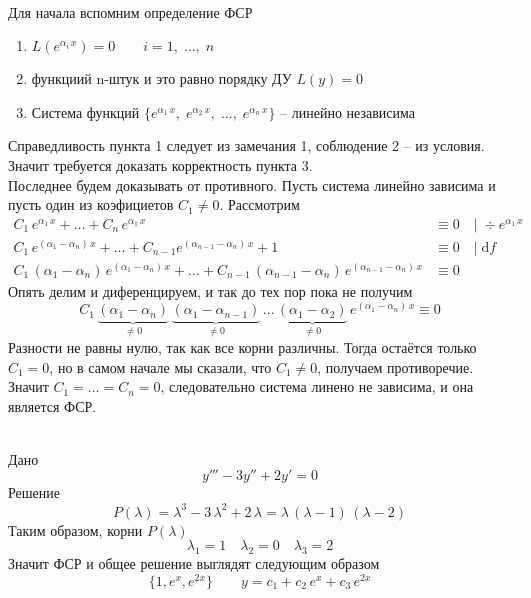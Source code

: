 \begin{Proof}~\\
    Для начала вспомним определение ФСР
    \begin{enumerate}
        \item $L(e^{\alpha_i\,x})=0 \qquad i=1,\; \dots,\; n$
        
        \item функциий n-штук и это равно порядку ДУ $L(y)=0$
        
        \item Система функций $\{e^{\alpha_1\,x},\; e^{\alpha_2\,x},\; \dots,\; e^{\alpha_n\,x}\}$ -- линейно независима
    \end{enumerate}
    
    Справедливость пункта 1 следует из замечания 1, соблюдение 2 -- из условия. Значит требуется доказать корректность пункта 3. \\
    
    Последнее будем доказывать от противного. Пусть система линейно зависима и пусть один из коэфициетов $C_1 \neq 0$. Рассмотрим
    \begin{align*}
        C_1\,e^{\alpha_1\,x} + \dots +C_n\,e^{\alpha_1\,x} &\equiv 0 \quad | \; \div e^{\alpha_1\,x}\\
        C_1\,e^{(\alpha_1-\alpha_n)\,x} + \dots + C_{n-1} e^{(\alpha_{n-1}-\alpha_n)\,x} + 1 &\equiv 0 \quad |\; \mathrm{d}f\\
        C_1\,(\alpha_1-\alpha_n)\,e^{(\alpha_1-\alpha_n)\,x} + \dots + C_{n-1}\,(\alpha_{n-1}-\alpha_n)\,e^{(\alpha_{n-1}-\alpha_n)\,x} &\equiv 0
    \end{align*}
    Опять делим и диференцируем, и так до тех пор пока не получим
    \[
        C_1\,\underbrace{(\alpha_1-\alpha_n)}_{\neq 0}\,\underbrace{(\alpha_1-\alpha_{n-1})}_{\neq 0}\,\dots\,\underbrace{(\alpha_1-\alpha_2)}_{\neq 0}\,e^{(\alpha_1-\alpha_n)\,x}\equiv 0
    \]
    Разности не равны нулю, так как все корни различны. Тогда остаётся только $C_1 = 0$, но в самом начале мы сказали, что $C_1 \neq 0$, получаем противоречие.\\
    
    Значит $C_1=\dots=C_n=0$, следовательно система линено не зависима, и она является ФСР.\\
\end{Proof}

\begin{Example}~\\
    Дано
    \[
        y'''-3y''+2y'=0
    \]
    Решение
    \[
        P(\lambda)=\lambda^3-3\,\lambda^2+2\,\lambda=\lambda\,(\lambda-1)\,(\lambda-2)
    \]
    Таким образом, корни $P(\lambda)$
    \[
        \lambda_1=1 \quad \lambda_2=0 \quad \lambda_3=2  
    \]
    Значит ФСР и общее решение выглядят следующим образом
    \[
        \{1, e^x, e^{2x}\} \qquad y=c_1+c_2\,e^x+ c_3\,e^{2x}
    \]
\end{Example}

